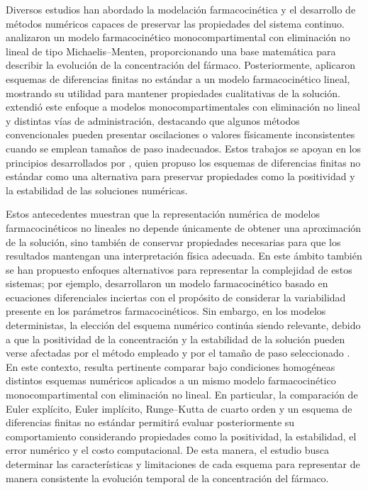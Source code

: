 \documentclass[11pt,final,5p,times,twocolumn,authoryear]{elsarticle}
\begin{document}
Diversos estudios han abordado la modelación farmacocinética y el desarrollo de métodos numéricos capaces de preservar las propiedades del sistema continuo. \citet{tang2007} analizaron un modelo farmacocinético monocompartimental con eliminación no lineal de tipo Michaelis–Menten, proporcionando una base matemática para describir la evolución de la concentración del fármaco. Posteriormente, \citet{egbelowo2017} aplicaron esquemas de diferencias finitas no estándar a un modelo farmacocinético lineal, mostrando su utilidad para mantener propiedades cualitativas de la solución. \citet{egbelowo2018} extendió este enfoque a modelos monocompartimentales con eliminación no lineal y distintas vías de administración, destacando que algunos métodos convencionales pueden presentar oscilaciones o valores físicamente inconsistentes cuando se emplean tamaños de paso inadecuados. Estos trabajos se apoyan en los principios desarrollados por \citet{mickens2002}, quien propuso los esquemas de diferencias finitas no estándar como una alternativa para preservar propiedades como la positividad y la estabilidad de las soluciones numéricas.

Estos antecedentes muestran que la representación numérica de modelos farmacocinéticos no lineales no depende únicamente de obtener una aproximación de la solución, sino también de conservar propiedades necesarias para que los resultados mantengan una interpretación física adecuada. En este ámbito también se han propuesto enfoques alternativos para representar la complejidad de estos sistemas; por ejemplo, \citet{yang2021} desarrollaron un modelo farmacocinético basado en ecuaciones diferenciales inciertas con el propósito de considerar la variabilidad presente en los parámetros farmacocinéticos. Sin embargo, en los modelos deterministas, la elección del esquema numérico continúa siendo relevante, debido a que la positividad de la concentración y la estabilidad de la solución pueden verse afectadas por el método empleado y por el tamaño de paso seleccionado \citep{egbelowo2018}. En este contexto, resulta pertinente comparar bajo condiciones homogéneas distintos esquemas numéricos aplicados a un mismo modelo farmacocinético monocompartimental con eliminación no lineal. En particular, la comparación de Euler explícito, Euler implícito, Runge–Kutta de cuarto orden y un esquema de diferencias finitas no estándar permitirá evaluar posteriormente su comportamiento considerando propiedades como la positividad, la estabilidad, el error numérico y el costo computacional. De esta manera, el estudio busca determinar las características y limitaciones de cada esquema para representar de manera consistente la evolución temporal de la concentración del fármaco.
\end{document}
